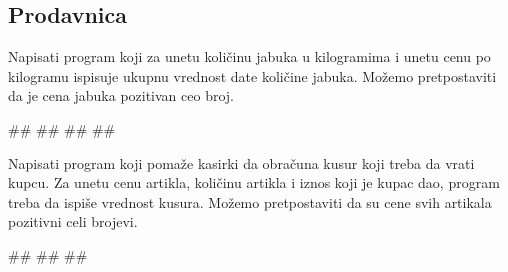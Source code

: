\subsection{Prodavnica}
\begin{Exercise}[label=p1_05]
Napisati program koji za unetu količinu jabuka u kilogramima i unetu
cenu po kilogramu ispisuje ukupnu vrednost date količine jabuka. Možemo pretpostaviti da je cena jabuka pozitivan ceo broj. \\
\begin{miditest}
\begin{upotreba}{1}
#\naslovInt#
##
##
##
\end{upotreba}
\end{miditest}
\end{Exercise}
\begin{Answer}[ref=p1_05]
\end{Answer}

\begin{Exercise}[label=p1.1_06] 
Napisati program koji pomaže kasirki da obračuna kusur koji treba da vrati kupcu. Za unetu cenu artikla, količinu artikla i iznos koji je kupac dao, program treba da ispiše vrednost kusura. Možemo pretpostaviti da su cene svih artikala pozitivni celi brojevi.\\
\begin{miditest}
\begin{upotreba}{1}
#\naslovInt#
##
##
\end{upotreba}
\end{miditest}
\end{Exercise}
\begin{Answer}[ref=p1.1_06]
\end{Answer}


